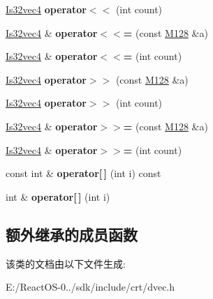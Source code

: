 \begin{DoxyCompactItemize}
\item 
\mbox{\label{class_is32vec4_a24cc71d890fd1801b80ebc5454f4fa61}} 
\hyperlink{class_is32vec4}{Is32vec4} {\bfseries operator$<$$<$} (int count)
\item 
\mbox{\label{class_is32vec4_acc179a17e9dc313e07880cc33932064b}} 
\hyperlink{class_is32vec4}{Is32vec4} \& {\bfseries operator$<$$<$=} (const \hyperlink{class_m128}{M128} \&a)
\item 
\mbox{\label{class_is32vec4_a4742e9147f5330df512644732549868f}} 
\hyperlink{class_is32vec4}{Is32vec4} \& {\bfseries operator$<$$<$=} (int count)
\item 
\mbox{\label{class_is32vec4_a6209def5c7ade64a982a03d7bacd4ee0}} 
\hyperlink{class_is32vec4}{Is32vec4} {\bfseries operator$>$$>$} (const \hyperlink{class_m128}{M128} \&a)
\item 
\mbox{\label{class_is32vec4_a16bde46e5ee339651ae5cfb55e25413c}} 
\hyperlink{class_is32vec4}{Is32vec4} {\bfseries operator$>$$>$} (int count)
\item 
\mbox{\label{class_is32vec4_aee9acd04e06323054cd01c232e55e0e2}} 
\hyperlink{class_is32vec4}{Is32vec4} \& {\bfseries operator$>$$>$=} (const \hyperlink{class_m128}{M128} \&a)
\item 
\mbox{\label{class_is32vec4_a58d42d2b09d551ff6ae24bf971ed0cc0}} 
\hyperlink{class_is32vec4}{Is32vec4} \& {\bfseries operator$>$$>$=} (int count)
\item 
\mbox{\label{class_is32vec4_a328d1be3018df17ce16a6b4944399349}} 
const int \& {\bfseries operator\mbox{[}$\,$\mbox{]}} (int i) const
\item 
\mbox{\label{class_is32vec4_a8781e79b6e151e43d55a7507bab76e4c}} 
int \& {\bfseries operator\mbox{[}$\,$\mbox{]}} (int i)
\end{DoxyCompactItemize}
\subsection*{额外继承的成员函数}


该类的文档由以下文件生成\+:\begin{DoxyCompactItemize}
\item 
E\+:/\+React\+O\+S-\/0../sdk/include/crt/dvec.\+h\end{DoxyCompactItemize}
